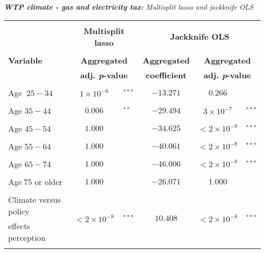 \documentclass[a4paper,12pt]{article}
\begin{document}
{\centering
\begin{threeparttable}
\caption{\small{\textit{\textbf{WTP climate - gas and electricity tax:} Multisplit lasso and jackknife OLS}}}


\label{Gas435cp} 
\centering
\begin{small}
\begin{tabular}{lclccl} 
\hline \vspace{-0.35cm} \\
  \multicolumn{1}{l}{} & \multicolumn{2}{c}{\large{\textbf{Multisplit lasso}}} %
  & \multicolumn{3}{c}{\large{\textbf{Jackknife OLS}}}  \\%
  
\vspace{-0.35cm} \\
  \multicolumn{1}{l}{\vspace{0.1cm}\textbf{Variable}} & \multicolumn{2}{c}{\textbf{Aggregated}}& \multicolumn{1}{c}{\textbf{Aggregated}} &  \multicolumn{2}{c}{\textbf{Aggregated}} \\
    \multicolumn{1}{l}{ } & \multicolumn{2}{c}{\textbf{adj. \textit{p}-value}}& \multicolumn{1}{c}{\textbf{coefficient}} &  \multicolumn{2}{c}{\textbf{adj. \textit{p}-value}} \\
 \hline 
\hline
\\
\vspace{-0.35cm}Age\tnote{a} $~25-34$&$1\times10^{-6}$&$^{***}$&$-13.271$&$0.266$& \\
        \\
\vspace{-0.35cm}Age $35-44$&$0.006$&$^{**}$&$-29.494$&$3\times10^{-7}$&$^{***}$\\
        \\ 
 \vspace{-0.35cm}Age $45-54$&$1.000$& &$-34.625$&$<2\times10^{-8}$&$^{***}$\\
        \\ 
  \vspace{-0.35cm}Age $55-64$&$1.000$& &$-40.061$&$<2\times10^{-8}$&$^{***}$\\
        \\       
 \vspace{-0.35cm}Age $65-74$&$1.000$& &$-46.006$&$<2\times10^{-8}$&$^{***}$\\
        \\ 
 \vspace{-0.35cm}Age$~75$ or older&$1.000$& &$-26.071$&$1.000$& \\
        \\       
 Climate versus policy&\multirow{2}{*}{$<2\times10^{-8}$}&\multirow{2}{*}{$^{***}$}&\multirow{2}{*}{$10.408$}&\multirow{2}{*}{$<2\times10^{-8}$}&\multirow{2}{*}{$^{***}$}\\
\vspace{-0.35cm}\hspace{0.6cm}effects perception&&&\\
 \\  
  

\end{tabular}
\end{small}
\end{threeparttable}}
\end{document}

